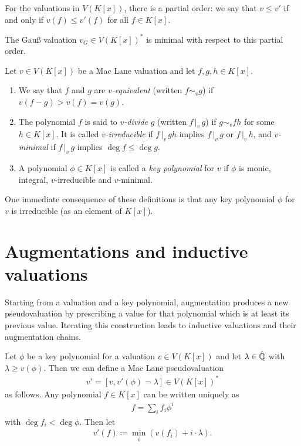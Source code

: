 For the valuations in $V(K[x])$, there is a partial order: we say that $v \leq v'$ if and only if $v(f) \leq v'(f)$ for all $f\in K[x]$.

\begin{example}
    The Gauß valuation $v_{\scriptscriptstyle G} \in V(K[x])^*$ is minimal with respect to this partial order.
\end{example}

\begin{definition}
    Let $v\in V(K[x])$ be a Mac Lane valuation and let $f,g,h \in K[x]$.
    \begin{enumerate}[label=\textup{(\alph*)}]
        \item We say that $f$ and $g$ are \textit{$v$-equivalent} (written $f \sim_v g$) if $v(f-g) > v(f) = v(g)$.
        \item The polynomial $f$ is said to \textit{$v$-divide} $g$ (written $f\, |_v\, g$) if $g \sim_v fh$ for some $h \in K[x]$.
            It is called \textit{$v$-irreducible} if $f\, |_v\, gh$ implies $f\, |_v\, g$ or $f\, |_v\, h$,
            and \textit{$v$-minimal} if $f\, |_v\, g$ implies $\deg f \leq \deg g$.
        \item A polynomial $\phi \in K[x]$ is called a \textit{key polynomial} for $v$ if $\phi$ is monic, integral, $v$-irreducible and $v$-minimal.
    \end{enumerate}
\end{definition}

\begin{remark}
    One immediate consequence of these definitions is that any key polynomial $\phi$ for $v$ is irreducible (as an element of $K[x]$).
\end{remark}

\section{Augmentations and inductive valuations}\label{sec:augmentations-and-inductive-valuations}
Starting from a valuation and a key polynomial, augmentation produces a new pseudovaluation by prescribing a value for that polynomial which is at least its previous value. Iterating this construction leads to inductive valuations and their augmentation chains.

Let $\phi$ be a key polynomial for a valuation $v \in V(K[x])$ and let $\lambda \in \hat{\mathbb Q}$ with $\lambda \geq v(\phi)$.
Then we can define a Mac Lane pseudovaluation
\begin{align} \label{eq:def-augmentation}
    v' = [v, v'(\phi) = \lambda] \in V(K[x])^*
\end{align}
as follows.
Any polynomial $f \in K[x]$ can be written uniquely as
\begin{align}
    f = \sum_i f_i \phi^i
\end{align}
with $\deg f_i < \deg \phi$. Then let
\begin{align}
    v'(f) \coloneqq \min_i(v(f_i) + i\cdot \lambda).
\end{align}

